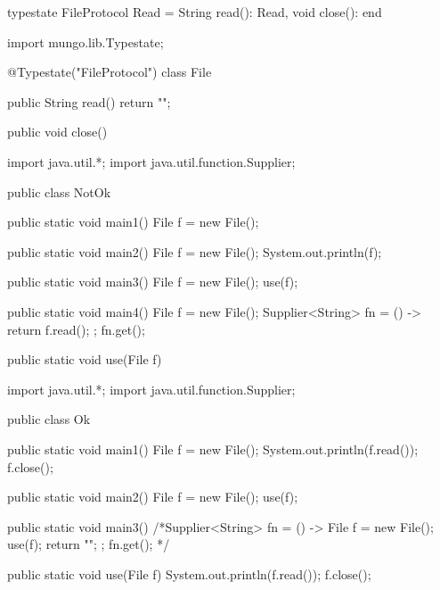 \begin{code}
typestate FileProtocol {
  Read = {
    String read(): Read,
    void close(): end
  }
}\end{code}

\begin{code}
import mungo.lib.Typestate;

@Typestate("FileProtocol")
class File {

  public String read() {
    return "";
  }

  public void close() {
  }

}\end{code}

\begin{code}
import java.util.*;
import java.util.function.Supplier;

public class NotOk {
  public static void main1() {
    File f = new File();
  }

  public static void main2() {
    File f = new File();
    System.out.println(f);
  }

  public static void main3() {
    File f = new File();
    use(f);
  }

  public static void main4() {
    File f = new File();
    Supplier<String> fn = () -> {
      return f.read();
    };
    fn.get();
  }

  public static void use(File f) {

  }
}\end{code}

\begin{code}
import java.util.*;
import java.util.function.Supplier;

public class Ok {
  public static void main1() {
    File f = new File();
    System.out.println(f.read());
    f.close();
  }

  public static void main2() {
    File f = new File();
    use(f);
  }

  public static void main3() {
    /*Supplier<String> fn = () -> {
      File f = new File();
      use(f);
      return "";
    };
    fn.get();
    */
  }

  public static void use(File f) {
    System.out.println(f.read());
    f.close();
  }
}\end{code}

